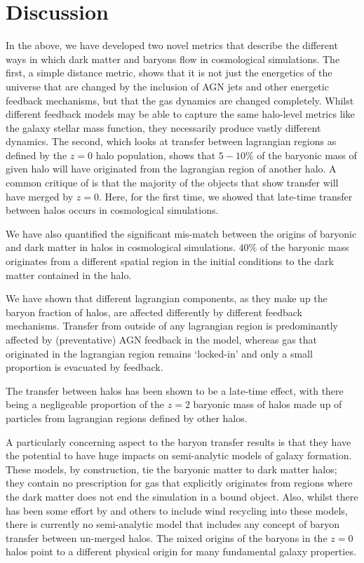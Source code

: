 \section{Discussion}
\label{sec:conclusions}

In the above, we have developed two novel metrics that describe the different
ways in which dark matter and baryons flow in cosmological simulations. The
first, a simple distance metric, shows that it is not just the energetics of
the universe that are changed by the inclusion of AGN jets and other energetic
feedback mechanisms, but that the gas dynamics are changed completely. Whilst
different feedback models may be able to capture the same halo-level metrics
like the galaxy stellar mass function, they necessarily produce vastly
different dynamics. The second, which looks at transfer between lagrangian
regions as defined by the $z=0$ halo population, shows that $5-10\%$ of the
baryonic mass of given halo will have originated from the lagrangian region
of another halo. A common critique of \citet{AnglesAlcazar2017} is that the
majority of the objects that show transfer will have merged by $z=0$. Here,
for the first time, we showed that late-time transfer between halos occurs
in cosmological simulations.

We have also quantified the significant mis-match between the origins of
baryonic and dark matter in halos in cosmological simulations. $40\%$ of the
baryonic mass originates from a different spatial region in the initial
conditions to the dark matter contained in the halo.

We have shown that different lagrangian components, as they make up the
baryon fraction of halos, are affected differently by different feedback
mechanisms. Transfer from outside of any lagrangian region is predominantly
affected by (preventative) AGN feedback in the \simba{} model, whereas gas
that originated in the lagrangian region remains `locked-in' and only a small
proportion is evacuated by feedback.

The transfer between halos has been shown to be a late-time effect, with
there being a negligeable proportion of the $z=2$ baryonic mass of halos
made up of particles from lagrangian regions defined by other halos.

A particularly concerning aspect to the baryon transfer results is that they
have the potential to have huge impacts on semi-analytic models of galaxy
formation. These models, by construction, tie the baryonic matter to dark
matter halos; they contain no prescription for gas that explicitly originates
from regions where the dark matter does not end the simulation in a bound
object. Also, whilst there has been some effort by \citet{Henriques2015} and
others to include wind recycling into these models, there is currently
no semi-analytic model that includes any concept of baryon transfer between
un-merged halos. The mixed origins of the baryons in the $z=0$ halos
point to a different physical origin for many fundamental galaxy properties.

